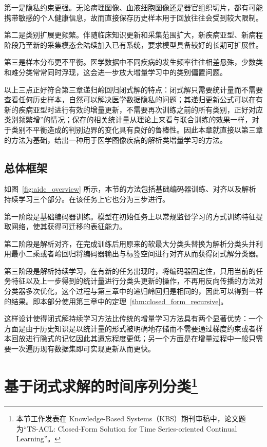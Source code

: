 第一是隐私约束更强。无论病理图像、血液细胞图像还是器官组织切片，都有可能携带敏感的个人健康信息，故而直接保存历史样本用于回放往往会受到较大限制。

第二是类别扩展更频繁。伴随临床知识更新和采集范围扩大，新疾病亚型、新病程阶段乃至新的采集模态会陆续加入已有系统，要求模型具备较好的长期可扩展性。

第三是样本分布更不平衡。医学数据中不同疾病的发生频率往往相差悬殊，少数类和难分类常常同时浮现，这会进一步放大增量学习中的类别偏置问题。

以上三点正好符合第三章递归岭回归闭式解的特点：闭式解只需要统计量而不需要查看任何历史样本，自然可以解决医学数据隐私的问题；其递归更新公式可以在有新的疾病亚型时进行有效的增量更新，不需要再次训练之前的所有类别，正好对应类别频繁增”的情况；保存的相关统计量从理论上来看与联合训练的效果一样，对于类别不平衡造成的判别边界的变化具有良好的鲁棒性。因此本章就直接以第三章的方法为基础，给出一种用于医学图像疾病的解析类增量学习的方法。

\subsection{总体框架}

如图~\ref{fig:aidc_overview} 所示，本节的方法包括基础编码器训练、对齐以及解析持续学习三个部分。在该任务上它也分为三步进行。

第一阶段是基础编码器训练。模型在初始任务上以常规监督学习的方式训练特征提取网络，使其获得可迁移的表征能力。

第二阶段是解析对齐，在完成训练后用原来的软最大分类头替换为解析分类头并利用最小二乘或者岭回归将编码器输出与标签空间进行对齐从而获得闭式解分类器。

第三阶段是解析持续学习，在有新的任务出现时，将编码器固定住，只用当前的任务特征以及上一步得到的统计量进行分类头更新的操作，不再用反向传播的方法对分类器多次优化，这个过程与第三章中的递归岭回归是相同的，因此可以得到一样的结果。即本部分使用第三章中的定理~\ref{thm:closed_form_recursive}。

这样设计使得闭式解持续学习方法比传统的增量学习方法具有两个显著优势：一个方面是由于历史知识是以统计量的形式被明确地存储而不需要通过梯度约束或者样本回放进行隐式的记忆因此其遗忘程度更低；另一个方面是在增量过程中一般只需要一次遍历现有数据集即可实现更新从而更快。

\section[基于闭式求解的时间序列分类]{基于闭式求解的时间序列分类\footnote{本节工作发表在 Knowledge-Based Systems（KBS）期刊审稿中，论文题为``TS-ACL: Closed-Form Solution for Time Series-oriented Continual Learning''。}}

